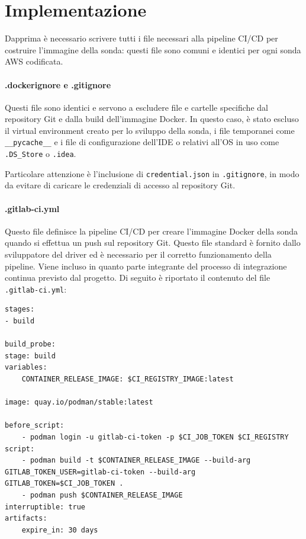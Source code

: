 \section{Implementazione}
\label{sec:implementazione}

Dapprima è necessario scrivere tutti i file necessari alla pipeline CI/CD per costruire l'immagine della sonda: questi file sono comuni e identici per ogni sonda AWS codificata.

\paragraph{.dockerignore e .gitignore} Questi file sono identici e servono a escludere file e cartelle specifiche dal repository Git e dalla build dell'immagine Docker. In questo caso, è stato escluso il virtual environment creato per lo sviluppo della sonda, i file temporanei come \texttt{\_\_pycache\_\_} e i file di configurazione dell'IDE o relativi all'OS in uso come \texttt{.DS\_Store} o \texttt{.idea}. 

Particolare attenzione è l'inclusione di \texttt{credential.json} in \texttt{.gitignore}, in modo da evitare di caricare le credenziali di accesso al repository Git. 

\paragraph{.gitlab-ci.yml} Questo file definisce la pipeline CI/CD per creare l'immagine Docker della sonda quando si effettua un push sul repository Git. Questo file standard è fornito dallo sviluppatore del driver ed è necessario per il corretto funzionamento della pipeline. Viene incluso in quanto parte integrante del processo di integrazione continua previsto dal progetto. Di seguito è riportato il contenuto del file \texttt{.gitlab-ci.yml}:

\begin{lstlisting}[style=mygitlabci, caption={File \texttt{.gitlab-ci.yml} per la definizione della pipeline CI/CD}]
stages:
- build

build_probe:
stage: build
variables:
    CONTAINER_RELEASE_IMAGE: $CI_REGISTRY_IMAGE:latest

image: quay.io/podman/stable:latest

before_script:
    - podman login -u gitlab-ci-token -p $CI_JOB_TOKEN $CI_REGISTRY
script:
    - podman build -t $CONTAINER_RELEASE_IMAGE --build-arg GITLAB_TOKEN_USER=gitlab-ci-token --build-arg GITLAB_TOKEN=$CI_JOB_TOKEN .
    - podman push $CONTAINER_RELEASE_IMAGE
interruptible: true
artifacts:
    expire_in: 30 days
\end{lstlisting}

